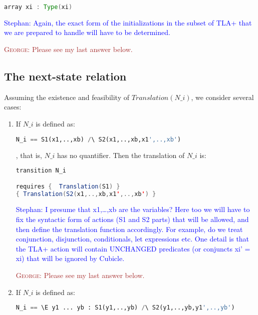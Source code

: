 \documentclass{article}
\theoremstyle{plain}
\numberwithin{equation}{section}
\newcommand{\george}[1]{\textcolor{brown}{\textsc{George: } {\sf #1}}}
\newcommand{\ste}[1]{\par\noindent\textcolor{blue}{\small Stephan: #1}}
\begin{document}
\begin{lstlisting}[language=Java]
array xi : Type(xi) 
\end{lstlisting}


\ste{Again, the exact form of the initializations in the subset of TLA+ that we
  are prepared to handle will have to be determined.}

\george{Please see my last answer below.}

\subsection*{The next-state relation} 
Assuming the existence and feasibility of \emph{$Translation(N\_i)$}, we consider several cases:


\begin{enumerate}

\item If  $N\_i$ is defined as:

\begin{lstlisting}[language=Python]
N_i == S1(x1,..,xb) /\ S2(x1,..,xb,x1',..,xb')
\end{lstlisting}
, that is, $N\_i$ has no quantifier. Then the translation of  $N\_i$ is: 


\begin{lstlisting}[language=Java]
transition N_i 

requires {  Translation(S1) }
{ Translation(S2(x1,..,xb,x1',..,xb') }

\end{lstlisting}







\ste{I presume that x1,\dots,xb are the variables? Here too we will have to fix
  the syntactic form of actions (S1 and S2 parts) that will be allowed, and then
  define the translation function accordingly. For example, do we treat
  conjunction, disjunction, conditionals, let expressions etc.
  One detail is that the TLA+ action will contain UNCHANGED predicates (or
  conjuncts xi' = xi) that will be ignored by Cubicle.}

  \george{Please see my last answer below.  }

\item If  $N\_i$ is defined as:

\begin{lstlisting}[language=Python]
N_i == \E y1 ... yb : S1(y1,..,yb) /\ S2(y1,..,yb,y1',..,yb')
\end{lstlisting}


\end{enumerate}
\end{document}
